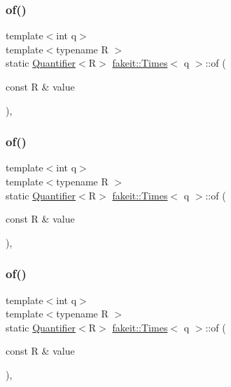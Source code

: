 \subsubsection{\texorpdfstring{of()}{of()}\hspace{0.1cm}{\footnotesize\ttfamily [3/9]}}
{\footnotesize\ttfamily template$<$int q$>$ \\
template$<$typename R $>$ \\
static \mbox{\hyperlink{structfakeit_1_1Quantifier}{Quantifier}}$<$R$>$ \mbox{\hyperlink{structfakeit_1_1Times}{fakeit\+::\+Times}}$<$ q $>$\+::of (\begin{DoxyParamCaption}\item[{const R \&}]{value }\end{DoxyParamCaption})\hspace{0.3cm}{\ttfamily [inline]}, {\ttfamily [static]}}

\mbox{\label{structfakeit_1_1Times_a9c53fb71e7c6d2e295a77909bd971193}} 
\subsubsection{\texorpdfstring{of()}{of()}\hspace{0.1cm}{\footnotesize\ttfamily [4/9]}}
{\footnotesize\ttfamily template$<$int q$>$ \\
template$<$typename R $>$ \\
static \mbox{\hyperlink{structfakeit_1_1Quantifier}{Quantifier}}$<$R$>$ \mbox{\hyperlink{structfakeit_1_1Times}{fakeit\+::\+Times}}$<$ q $>$\+::of (\begin{DoxyParamCaption}\item[{const R \&}]{value }\end{DoxyParamCaption})\hspace{0.3cm}{\ttfamily [inline]}, {\ttfamily [static]}}

\mbox{\label{structfakeit_1_1Times_a9c53fb71e7c6d2e295a77909bd971193}} 
\subsubsection{\texorpdfstring{of()}{of()}\hspace{0.1cm}{\footnotesize\ttfamily [5/9]}}
{\footnotesize\ttfamily template$<$int q$>$ \\
template$<$typename R $>$ \\
static \mbox{\hyperlink{structfakeit_1_1Quantifier}{Quantifier}}$<$R$>$ \mbox{\hyperlink{structfakeit_1_1Times}{fakeit\+::\+Times}}$<$ q $>$\+::of (\begin{DoxyParamCaption}\item[{const R \&}]{value }\end{DoxyParamCaption})\hspace{0.3cm}{\ttfamily [inline]}, {\ttfamily [static]}}

